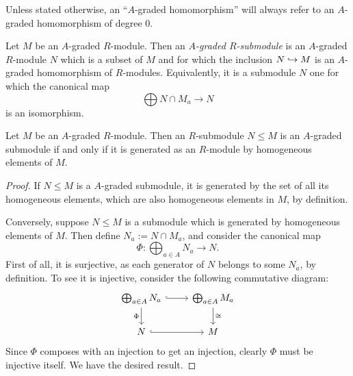 \documentclass[../main.tex]{subfiles}
\begin{document}
Unless stated otherwise, an ``$A$-graded homomorphism'' will always refer to an $A$-graded homomorphism of degree $0$. 

\begin{definition}
	Let $M$ be an $A$-graded $R$-module. Then an \emph{$A$-graded $R$-submodule} is an $A$-graded $R$-module $N$ which is a subset of $M$ and for which the inclusion $N\hookrightarrow M$ is an $A$-graded homomorphism of $R$-modules. Equivalently, it is a submodule $N$ one for which the canonical map
	\[\bigoplus N\cap M_a\to N\]
	is an isomorphism.
\end{definition}

\begin{lemma}\label{submodule_lemma}
	Let $M$ be an $A$-graded $R$-module. Then an $R$-submodule $N\leq M$ is an $A$-graded submodule if and only if it is generated as an $R$-module by homogeneous elements of $M$.
\end{lemma}
\begin{proof}
	If $N\leq M$ is a $A$-graded submodule, it is generated by the set of all its homogeneous elements, which are also homogeneous elements in $M$, by definition.

	Conversely, suppose $N\leq M$ is a submodule which is generated by homogeneous elements of $M$. Then define $N_a:=N\cap M_a$, and consider the canonical map
	\[\Phi:\bigoplus_{a\in A}N_a\to N.\]
	First of all, it is surjective, as each generator of $N$ belongs to some $N_a$, by definition. To see it is injective, consider the following commutative diagram:
	\[\begin{tikzcd}
		{\bigoplus_{a\in A}N_a} & {\bigoplus_{a\in A}M_a} \\
		N & M
		\arrow[hook, from=1-1, to=1-2]
		\arrow["\cong", from=1-2, to=2-2]
		\arrow["\Phi"', from=1-1, to=2-1]
		\arrow[hook, from=2-1, to=2-2]
	\end{tikzcd}\]
	Since $\Phi$ composes with an injection to get an injection, clearly $\Phi$ must be injective itself. We have the desired result.
\end{proof}
\end{document}
